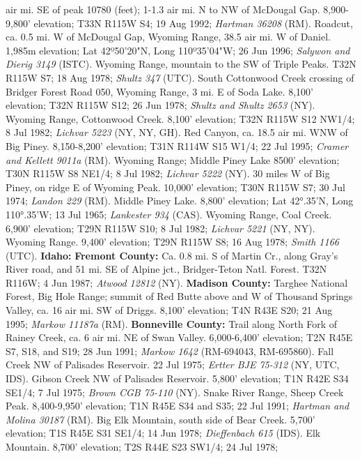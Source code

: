 air mi. SE of peak 10780 (feet); 1-1.3 air mi. N to NW of McDougal Gap.
8,900-9,800' elevation; T33N R115W S4; 19 Aug 1992; \textit{Hartman 36208} (RM).
Roadcut, ca. 0.5 mi. W of McDougal Gap, Wyoming Range, 38.5 air mi. W of Daniel.
1,985m elevation; Lat 42º50'20"N, Long 110º35'04"W; 26 Jun 1996;
\textit{Salywon and Dierig 3149} (ISTC).
Wyoming Range, mountain to the SW of Triple Peaks. T32N R115W S7; 18 Aug 1978;
\textit{Shultz 347} (UTC).
South Cottonwood Creek crossing of Bridger Forest Road 050, Wyoming Range,
3 mi. E of Soda Lake. 8,100' elevation; T32N R115W S12; 26 Jun 1978;
\textit{Shultz and Shultz 2653} (NY).
Wyoming Range, Cottonwood Creek. 8,100' elevation; T32N R115W S12 NW1/4;
8 Jul 1982; \textit{Lichvar 5223} (NY, NY, GH).
Red Canyon, ca. 18.5 air mi. WNW of Big Piney. 8,150-8,200' elevation;
T31N R114W S15 W1/4; 22 Jul 1995; \textit{Cramer and Kellett 9011a} (RM).
Wyoming Range; Middle Piney Lake 8500' elevation; T30N R115W S8 NE1/4;
8 Jul 1982; \textit{Lichvar 5222} (NY).
30 miles W of Big Piney, on ridge E of Wyoming Peak. 10,000' elevation;
T30N R115W S7; 30 Jul 1974; \textit{Landon 229} (RM).
Middle Piney Lake. 8,800' elevation; Lat 42°.35'N, Long 110°.35’W; 13 Jul 1965;
\textit{Lankester 934} (CAS).
Wyoming Range, Coal Creek. 6,900' elevation; T29N R115W S10; 8 Jul 1982;
\textit{Lichvar 5221} (NY, NY).
Wyoming Range. 9,400' elevation; T29N R115W S8; 16 Aug 1978;
\textit{Smith 1166} (UTC).
  \textbf{Idaho:}
  \textbf{Fremont County:}
Ca. 0.8 mi. S of Martin Cr., along Gray's River road, and 51 mi. SE of
Alpine jct., Bridger-Teton Natl. Forest. T32N R116W; 4 Jun 1987;
\textit{Atwood 12812} (NY).
  \textbf{Madison County:}
Targhee National Forest, Big Hole Range; summit of Red Butte above and W of
Thousand Springs Valley, ca. 16 air mi. SW of Driggs. 8,100' elevation;
T4N R43E S20; 21 Aug 1995; \textit{Markow 11187a} (RM).
  \textbf{Bonneville County:}
Trail along North Fork of Rainey Creek, ca. 6 air mi. NE of Swan Valley.
6,000-6,400' elevation; T2N R45E S7, S18, and S19; 28 Jun 1991;
\textit{Markow 1642} (RM-694043, RM-695860).
Fall Creek NW of Palisades Reservoir. 22 Jul 1975;
\textit{Ertter BJE 75-312} (NY, UTC, IDS).
Gibson Creek NW of Palisades Reservoir. 5,800' elevation; T1N R42E S34 SE1/4;
7 Jul 1975; \textit{Brown CGB 75-110} (NY).
Snake River Range, Sheep Creek Peak. 8,400-9,950' elevation;
T1N R45E S34 and S35; 22 Jul 1991; \textit{Hartman and Molina 30187} (RM).
Big Elk Mountain, south side of Bear Creek. 5,700' elevation;
T1S R45E S31 SE1/4; 14 Jun 1978; \textit{Dieffenbach 615} (IDS).
Elk Mountain. 8,700' elevation; T2S R44E S23 SW1/4; 24 Jul 1978;
